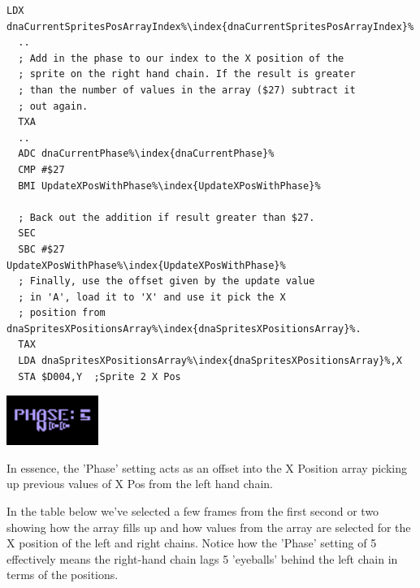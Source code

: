 \begin{minipage}[b]{0.75\linewidth}
\centering
\begin{lstlisting}[caption=\icode{dnaCurrentPhase\index{dnaCurrentPhase}} is
set by the 'Q' key. ,basicstyle=\scriptsize\ttfamily,escapechar=\%]
  LDX dnaCurrentSpritesPosArrayIndex%\index{dnaCurrentSpritesPosArrayIndex}%
  ..
  ; Add in the phase to our index to the X position of the 
  ; sprite on the right hand chain. If the result is greater
  ; than the number of values in the array ($27) subtract it
  ; out again.
  TXA
  ..
  ADC dnaCurrentPhase%\index{dnaCurrentPhase}%
  CMP #$27
  BMI UpdateXPosWithPhase%\index{UpdateXPosWithPhase}%

  ; Back out the addition if result greater than $27.
  SEC
  SBC #$27
UpdateXPosWithPhase%\index{UpdateXPosWithPhase}%   
  ; Finally, use the offset given by the update value 
  ; in 'A', load it to 'X' and use it pick the X 
  ; position from dnaSpritesXPositionsArray%\index{dnaSpritesXPositionsArray}%.
  TAX
  LDA dnaSpritesXPositionsArray%\index{dnaSpritesXPositionsArray}%,X
  STA $D004,Y  ;Sprite 2 X Pos
\end{lstlisting}
\end{minipage}
\hspace{0.5cm}
\begin{minipage}[b]{0.25\linewidth}
\centering
      \includegraphics[width=3cm]{dna/dnaphase.png}%
      \vspace{2cm}
\end{minipage}
In essence, the 'Phase' setting  acts as an offset into the X
Position array picking up previous values of X Pos from the left hand
chain.

In the table below we've selected a few frames from the first second or two showing how the array fills up and how values from
the array are selected for the X position of the left and right chains. Notice how the 'Phase' setting of 5 effectively means
the right-hand chain lags 5 'eyeballs' behind the left chain in terms of the positions.

